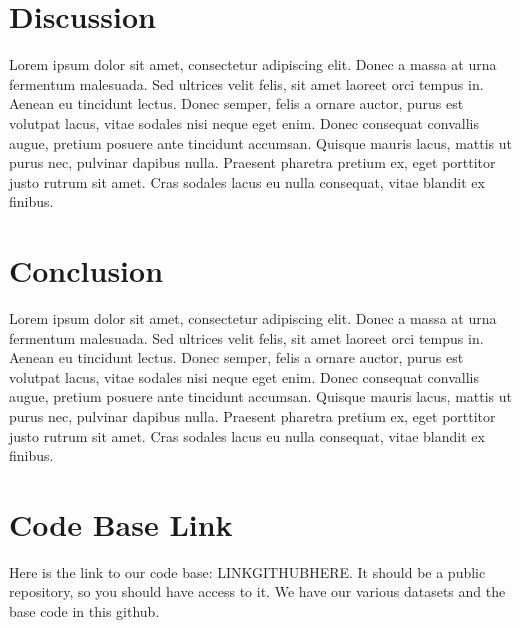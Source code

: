 \documentclass[11pt]{article}
\begin{document}
\section{Discussion}
Lorem ipsum dolor sit amet, consectetur adipiscing elit. Donec a massa at urna fermentum malesuada. Sed ultrices velit felis, sit amet laoreet orci tempus in. Aenean eu tincidunt lectus. Donec semper, felis a ornare auctor, purus est volutpat lacus, vitae sodales nisi neque eget enim. Donec consequat convallis augue, pretium posuere ante tincidunt accumsan. Quisque mauris lacus, mattis ut purus nec, pulvinar dapibus nulla. Praesent pharetra pretium ex, eget porttitor justo rutrum sit amet. Cras sodales lacus eu nulla consequat, vitae blandit ex finibus.

\section{Conclusion}
Lorem ipsum dolor sit amet, consectetur adipiscing elit. Donec a massa at urna fermentum malesuada. Sed ultrices velit felis, sit amet laoreet orci tempus in. Aenean eu tincidunt lectus. Donec semper, felis a ornare auctor, purus est volutpat lacus, vitae sodales nisi neque eget enim. Donec consequat convallis augue, pretium posuere ante tincidunt accumsan. Quisque mauris lacus, mattis ut purus nec, pulvinar dapibus nulla. Praesent pharetra pretium ex, eget porttitor justo rutrum sit amet. Cras sodales lacus eu nulla consequat, vitae blandit ex finibus.

\section{Code Base Link}
Here is the link to our code base: LINKGITHUBHERE. It should be a public repository, so you should have access to it. We have our various datasets and the base code in this github.



\end{document}
